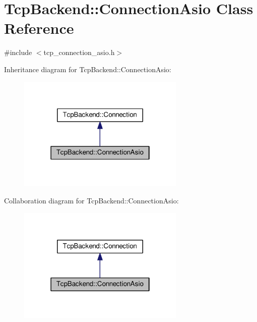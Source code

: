 \hypertarget{classTcpBackend_1_1ConnectionAsio}{}\section{Tcp\+Backend\+:\+:Connection\+Asio Class Reference}
\label{classTcpBackend_1_1ConnectionAsio}


{\ttfamily \#include $<$tcp\+\_\+connection\+\_\+asio.\+h$>$}



Inheritance diagram for Tcp\+Backend\+:\+:Connection\+Asio\+:
\nopagebreak
\begin{figure}[H]
\begin{center}
\leavevmode
\includegraphics[width=226pt]{classTcpBackend_1_1ConnectionAsio__inherit__graph}
\end{center}
\end{figure}


Collaboration diagram for Tcp\+Backend\+:\+:Connection\+Asio\+:
\nopagebreak
\begin{figure}[H]
\begin{center}
\leavevmode
\includegraphics[width=226pt]{classTcpBackend_1_1ConnectionAsio__coll__graph}
\end{center}
\end{figure}
